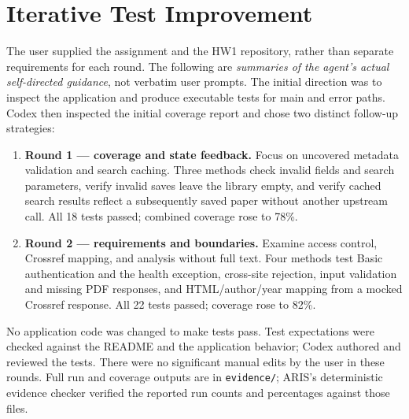 \documentclass[10pt]{article}
\begin{document}
\section{Iterative Test Improvement}
The user supplied the assignment and the HW1 repository, rather than separate requirements for each round. The following are \emph{summaries of the agent's actual self-directed guidance}, not verbatim user prompts. The initial direction was to inspect the application and produce executable tests for main and error paths. Codex then inspected the initial coverage report and chose two distinct follow-up strategies:
\begin{enumerate}
\item \textbf{Round 1 --- coverage and state feedback.} Focus on uncovered metadata validation and search caching. Three methods check invalid fields and search parameters, verify invalid saves leave the library empty, and verify cached search results reflect a subsequently saved paper without another upstream call. All 18 tests passed; combined coverage rose to 78\%.
\item \textbf{Round 2 --- requirements and boundaries.} Examine access control, Crossref mapping, and analysis without full text. Four methods test Basic authentication and the health exception, cross-site rejection, input validation and missing PDF responses, and HTML/author/year mapping from a mocked Crossref response. All 22 tests passed; coverage rose to 82\%.
\end{enumerate}
No application code was changed to make tests pass. Test expectations were checked against the README and the application behavior; Codex authored and reviewed the tests. There were no significant manual edits by the user in these rounds. Full run and coverage outputs are in \texttt{evidence/}; ARIS's deterministic evidence checker verified the reported run counts and percentages against those files.
\end{document}
